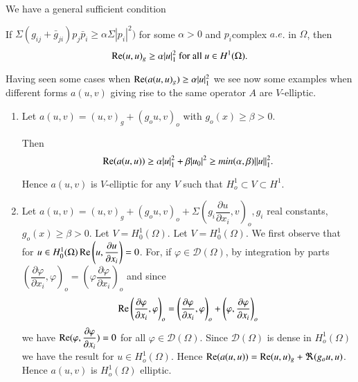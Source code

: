 We have a general sufficient condition
\begin{theorem}\label{lec10:sec6:subsec4:thm6.6} %
  If $\Sigma (g_{ij} + \bar{g}_{ji}) p_j \bar{p}_i \geq \alpha
  \Sigma|p_i|^2)$ for some $\alpha > 0$ and $p_i $complex $a.e$. in
  $\Omega$, then  
  $$
  \operatorname{Re}  (u, u)_g \geq \alpha |u|^2_1\text{ for all } u \in H^1 (\Omega). 
  $$
\end{theorem}

Having seen some cases when $\operatorname{Re}  (a(u, u)_g) \geq \alpha |u |^2_1$ we
see now some examples when different forms $a (u, v)$ giving rise to
the same operator $A$ are $V$-elliptic.  

\begin{enumerate}[1)]
\item Let $a(u, v)=  (u, v)_g + (g_o u, v)_o$ with $g_o (x)\geq \beta > 0$. 

  Then 
  $$
  \operatorname{Re}  (a(u, u)) \geq \alpha |u|^2_1 + \beta|u_0|^2 \geq min (\alpha,
  \beta) || u||^2_1. 
  $$

  Hence $a(u, v)$ is $V$-elliptic for any $V$  such that $H^1_o \subset
  V \subset H^1$. 
\item Let $a(u, v) = (u, v)_g + (g_o u, v)_o + \Sigma \left(g_i
  \dfrac{\partial u }{\partial x_i}, v\right)_o, g_i$ real constants, $
  g_o (x)\geq \beta > 0$. Let $V = H^1_0 (\Omega)$. Let $V =
  H^1_0(\Omega)$. We first observe that for $u 
  \in H^1_0(\Omega) \operatorname{Re}  \left(u, \dfrac{\partial u}{\partial
    x_i}\right)= 0$. For, if $\varphi \in \mathscr{D}(\Omega)$, by
  integration by parts $\left(\dfrac{\partial \varphi}{\partial
    x_i},\varphi \right)_o = \left( \varphi \dfrac{\partial \varphi }{\partial
    x_i}\right)_o$ and since  
  $$
  \operatorname{Re}  \left(\frac{\partial \varphi }{\partial x_i}, \varphi\right)_o =
  \left(\frac{\partial \varphi }{\partial x_i}, \varphi\right)_o +
  \left(\varphi, \frac{\partial \varphi }{\partial x_i}\right)_o 
  $$
  we have $\operatorname{Re}  (\varphi , \dfrac{\partial \varphi}{\partial x_i}) = 0$
  for all $\varphi \in \mathscr{D}(\Omega)$. Since
  $\mathscr{D}(\Omega)$ is dense in $H^1_o(\Omega) $we have the result
  for $u \in H^1_o(\Omega)$. Hence $\operatorname{Re}  (a (u, u)) = \operatorname{Re}  (u,
  u)_g+ \Re (g_o u, u)$. Hence $a(u, v)$ is $H^1_o (\Omega)$ elliptic.  
\end{enumerate}
